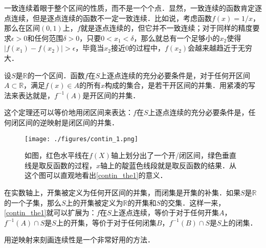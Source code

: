 一致连续着眼于整个区间的性质，而不是一个个点．显然，一致连续的函数肯定逐点连续，但是逐点连续的函数不一定一致连续．比如说，考虑函数$f(x)=1/x$，那么在区间$(0, 1)$上，$f$就是逐点连续的，但它并不一致连续；对于同样的精度要求$\epsilon>0$和任何范围$\delta>0$，只要$0<x_1<\delta$，那么就总有一个足够小的$x_2$使得$|f(x_1)-f(x_2)|>\epsilon$，毕竟当$x_2$接近$0$的过程中，$f(x_2)$会越来越趋近于无穷大．

\begin{theorem}{}\label{contin_the1}
设$S$是$\mathbb{R}$的一个区间．函数$f$在$S$上逐点连续的充分必要条件是，对于任何开区间$A\subset \mathbb{R}$，满足$f(x)\in A$的所有$x$构成的集合，是若干开区间的并集．用紧凑的写法来表达就是，$f^{-1}(A)$是开区间的并集．
\end{theorem}

这个定理还可以等价地用闭区间来表达：$f$在$S$上逐点连续的充分必要条件是，任何闭区间的逆映射是闭区间的并集．

\begin{figure}[ht]
\centering
\texttt{[image: ./figures/contin\_1.png]}
\caption{如图，红色水平线在$f(X)$轴上划分出了一个开/闭区间，绿色垂直线是取反函数的过程，$x$轴上的靛蓝色线段就是取反函数的结果．从这个图可以直观地看出\autoref{contin_the1}的意义．} \label{contin_fig1}
\end{figure}

在实数轴上，开集被定义为任何开区间的并集，而闭集是开集的补集．如果$S$是$\mathbb{R}$的一个子集，那么$S$上的开集被定义为$\mathbb{R}$的开集和$S$的交集．这样一来，\autoref{contin_the1}就可以扩展为：$f$在$S$上逐点连续，等价于对于任何开集$A$，$f^{-1}(A)\cap S$是$S$上的开集，等价于对于任何闭集$B$，$f^{-1}(B)\cap S$是$S$上的闭集．

用逆映射来刻画连续性是一个非常好用的方法．

